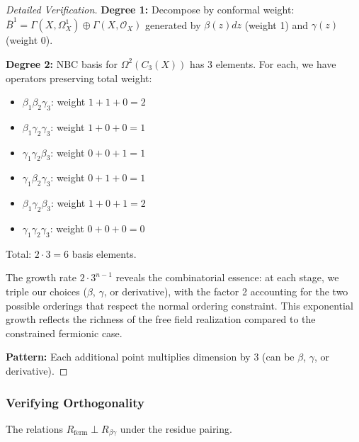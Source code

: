 \begin{proof}[Detailed Verification]
\textbf{Degree 1:} Decompose by conformal weight:
$\bar{B}^1 = \Gamma(X, \Omega^1_X) \oplus \Gamma(X, \mathcal{O}_X)$
generated by $\beta(z)dz$ (weight 1) and $\gamma(z)$ (weight 0).

\textbf{Degree 2:} NBC basis for $\Omega^2(C_3(X))$ has 3 elements.
For each, we have operators preserving total weight:
\begin{itemize}
\item $\beta_1 \beta_2 \gamma_3$: weight $1+1+0=2$
\item $\beta_1 \gamma_2 \gamma_3$: weight $1+0+0=1$  
\item $\gamma_1 \gamma_2 \beta_3$: weight $0+0+1=1$
\item $\gamma_1 \beta_2 \gamma_3$: weight $0+1+0=1$
\item $\beta_1 \gamma_2 \beta_3$: weight $1+0+1=2$
\item $\gamma_1 \gamma_2 \gamma_3$: weight $0+0+0=0$
\end{itemize}
Total: $2 \cdot 3 = 6$ basis elements.

\begin{remark}
The growth rate $2 \cdot 3^{n-1}$ reveals the combinatorial essence: at each stage, we triple our choices ($\beta$, $\gamma$, or derivative), with the factor 2 accounting for the two possible orderings that respect the normal ordering constraint. This exponential growth reflects the richness of the free field realization compared to the constrained fermionic case.
\end{remark}

\textbf{Pattern:} Each additional point multiplies dimension by 3 (can be $\beta$, $\gamma$, or derivative).
\end{proof}
 
\subsubsection{Verifying Orthogonality}
 
\begin{proposition}
The relations $R_{\text{ferm}} \perp R_{\beta\gamma}$ under the residue pairing.
\end{proposition}
 
